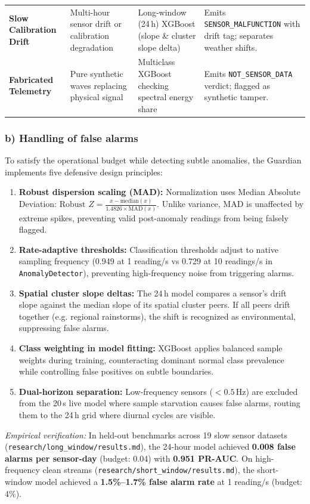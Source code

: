 \documentclass[11pt,a4paper]{article}
\begin{document}
\begin{table}[H]
\begin{tabularx}{\textwidth}{p{2.2cm}p{3.2cm}p{4.2cm}X}
\textbf{Slow Calibration Drift} & Multi-hour sensor drift or calibration degradation & Long-window (24\,h) XGBoost (slope \& cluster slope delta) & Emits \texttt{SENSOR\_MALFUNCTION} with drift tag; separates weather shifts. \\
\textbf{Fabricated Telemetry} & Pure synthetic waves replacing physical signal & Multiclass XGBoost checking spectral energy share & Emits \texttt{NOT\_SENSOR\_DATA} verdict; flagged as synthetic tamper. \\
\bottomrule
\end{tabularx}
\end{table}

\subsubsection{b) Handling of false alarms}
To satisfy the operational budget while detecting subtle anomalies, the Guardian implements five defensive design principles:
\begin{enumerate}[leftmargin=*,itemsep=1pt,topsep=2pt]
  \item \textbf{Robust dispersion scaling (MAD):} Normalization uses Median Absolute Deviation: $\text{Robust } Z = \frac{x - \text{median}(x)}{1.4826 \times \text{MAD}(x)}$. Unlike variance, MAD is unaffected by extreme spikes, preventing valid post-anomaly readings from being falsely flagged.
  \item \textbf{Rate-adaptive thresholds:} Classification thresholds adjust to native sampling frequency (0.949 at 1 reading/s vs 0.729 at 10 readings/s in \texttt{AnomalyDetector}), preventing high-frequency noise from triggering alarms.
  \item \textbf{Spatial cluster slope deltas:} The 24\,h model compares a sensor's drift slope against the median slope of its spatial cluster peers. If all peers drift together (e.g. regional rainstorms), the shift is recognized as environmental, suppressing false alarms.
  \item \textbf{Class weighting in model fitting:} XGBoost applies balanced sample weights during training, counteracting dominant normal class prevalence while controlling false positives on subtle boundaries.
  \item \textbf{Dual-horizon separation:} Low-frequency sensors ($<0.5$\,Hz) are excluded from the 20\,s live model where sample starvation causes false alarms, routing them to the 24\,h grid where diurnal cycles are visible.
\end{enumerate}
\textit{Empirical verification:} In held-out benchmarks across 19 slow sensor datasets (\texttt{research/long\_window/results.md}), the 24-hour model achieved \textbf{0.008 false alarms per sensor-day} (budget: 0.04) with \textbf{0.951 PR-AUC}. On high-frequency clean streams (\texttt{research/short\_window/results.md}), the short-window model achieved a \textbf{1.5\%--1.7\% false alarm rate} at 1 reading/s (budget: 4\%).
\end{document}
